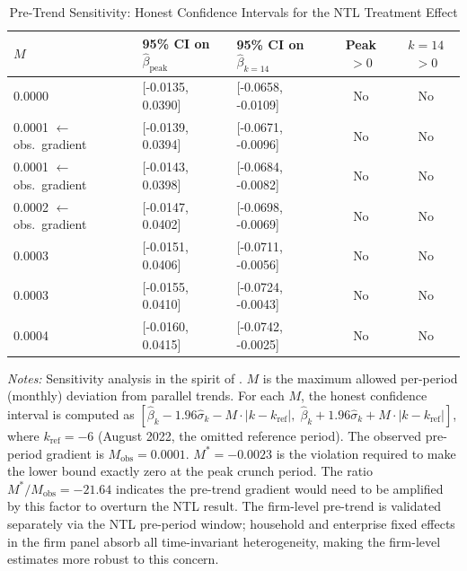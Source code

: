 \begin{table}[H]
\begin{threeparttable}
\caption{Pre-Trend Sensitivity: Honest Confidence Intervals for the NTL Treatment Effect}
\label{atab:pretrend_sensitivity}
\small
\begin{tabular}{lllcc}
\toprule
$M$ & 95\% CI on $\hat{\beta}_{\text{peak}}$ & 95\% CI on $\hat{\beta}_{k=14}$ & Peak $>0$ & $k{=}14$ $>0$ \\
\midrule
0.0000 & [-0.0135, 0.0390] & [-0.0658, -0.0109] & No & No \\
0.0001 $\leftarrow$ obs.\ gradient & [-0.0139, 0.0394] & [-0.0671, -0.0096] & No & No \\
0.0001 $\leftarrow$ obs.\ gradient & [-0.0143, 0.0398] & [-0.0684, -0.0082] & No & No \\
0.0002 $\leftarrow$ obs.\ gradient & [-0.0147, 0.0402] & [-0.0698, -0.0069] & No & No \\
0.0003 & [-0.0151, 0.0406] & [-0.0711, -0.0056] & No & No \\
0.0003 & [-0.0155, 0.0410] & [-0.0724, -0.0043] & No & No \\
0.0004 & [-0.0160, 0.0415] & [-0.0742, -0.0025] & No & No \\
\bottomrule
\end{tabular}
\begin{tablenotes}
\footnotesize
\item \textit{Notes:} Sensitivity analysis in the spirit of \citet{rambachandran2023pretrends}. $M$ is the maximum allowed per-period (monthly) deviation from parallel trends. For each $M$, the honest confidence interval is computed as $[\hat{\beta}_k - 1.96 \hat{\sigma}_k - M \cdot |k - k_{\text{ref}}|,\;\hat{\beta}_k + 1.96 \hat{\sigma}_k + M \cdot |k - k_{\text{ref}}|]$, where $k_{\text{ref}} = -6$ (August 2022, the omitted reference period). The observed pre-period gradient is $M_{\text{obs}} = 0.0001$. $M^* = -0.0023$ is the violation required to make the lower bound exactly zero at the peak crunch period. The ratio $M^*/M_{\text{obs}} = -21.64$ indicates the pre-trend gradient would need to be amplified by this factor to overturn the NTL result. The firm-level pre-trend is validated separately via the NTL pre-period window; household and enterprise fixed effects in the firm panel absorb all time-invariant heterogeneity, making the firm-level estimates more robust to this concern.
\end{tablenotes}
\end{threeparttable}
\end{table}
